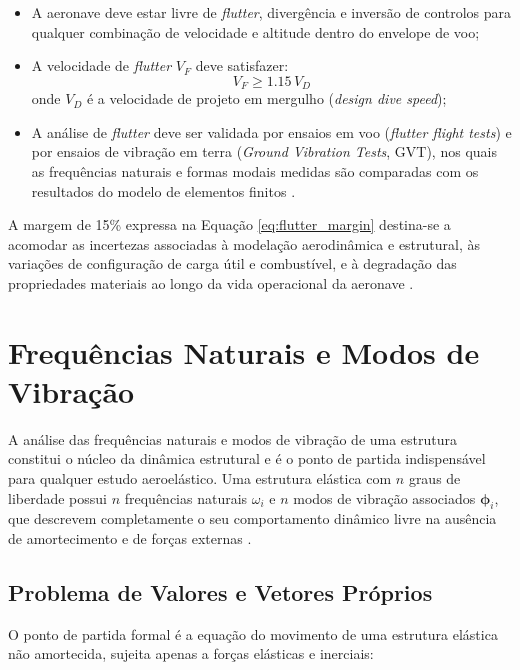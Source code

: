 \documentclass[11pt,twoside,a4paper]{report}
\begin{document}
\begin{itemize}
    \item A aeronave deve estar livre de \textit{flutter}, divergência e inversão de controlos para qualquer combinação de velocidade e altitude dentro do envelope de voo;
    \item A velocidade de \textit{flutter} $V_F$ deve satisfazer:
    \begin{equation}
        V_F \geq 1.15 \, V_D
        \label{eq:flutter_margin}
    \end{equation}
    \noindent onde $V_D$ é a velocidade de projeto em mergulho 
    (\textit{design dive speed});
    \item A análise de \textit{flutter} deve ser validada por ensaios em voo (\textit{flutter flight tests}) e por ensaios de vibração em terra (\textit{Ground Vibration Tests}, GVT), nos quais as frequências naturais e formas modais medidas são comparadas com os resultados do modelo de elementos finitos \cite{Ewins2000}.
\end{itemize}

A margem de 15\% expressa na Equação \eqref{eq:flutter_margin} destina-se a acomodar as incertezas associadas à modelação aerodinâmica e estrutural, às variações de configuração de carga útil e combustível, e à degradação das propriedades materiais ao longo da vida operacional da aeronave \cite{Wright2015}.


\section{Frequências Naturais e Modos de Vibração}

A análise das frequências naturais e modos de vibração de uma estrutura constitui o núcleo da dinâmica estrutural e é o ponto de partida indispensável para qualquer estudo aeroelástico. Uma estrutura elástica com $n$ graus de liberdade possui $n$ frequências naturais $\omega_i$ e $n$ modos de vibração associados $\boldsymbol{\phi}_i$, que descrevem completamente o seu comportamento dinâmico livre na ausência de amortecimento e de forças externas \cite{Craig2006, Clough1993}.

\subsection{Problema de Valores e Vetores Próprios}

O ponto de partida formal é a equação do movimento de uma estrutura elástica não amortecida, sujeita apenas a forças elásticas e inerciais:
\end{document}
